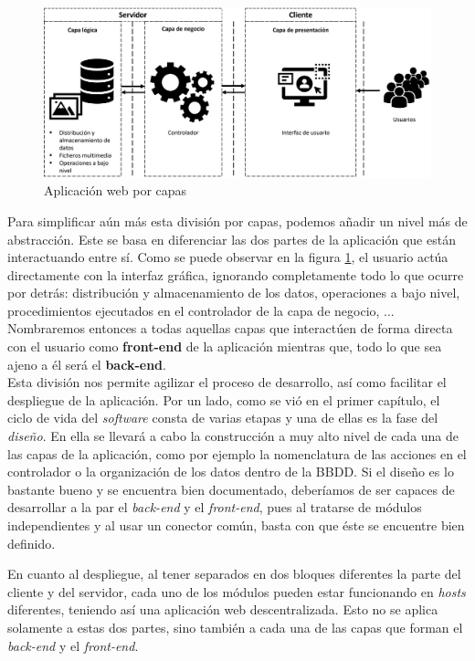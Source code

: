 \documentclass[../main.tex]{subfiles}
\begin{document}
    \begin{figure}[!h]
          \centering
          \includegraphics[width=\textwidth]{images/estructura_aplicacion_web.png}
          \caption{Aplicación web por capas}
          \label{fig:web_capas}
      \end{figure}
      
    Para simplificar aún más esta división por capas, podemos añadir un nivel más de abstracción. Este se basa en diferenciar las dos partes de la aplicación que están interactuando entre sí. Como se puede observar en la figura \ref{fig:web_capas}, el usuario actúa directamente con la interfaz gráfica, ignorando completamente todo lo que ocurre por detrás: distribución y almacenamiento de los datos, operaciones a bajo nivel, procedimientos ejecutados en el controlador de la capa de negocio, ... Nombraremos entonces a todas aquellas capas que interactúen de forma directa con el usuario como \textbf{front-end} de la aplicación mientras que, todo lo que sea ajeno a él será el \textbf{back-end}. \\
    
    Esta división nos permite agilizar el proceso de desarrollo, así como facilitar el despliegue de la aplicación. Por un lado, como se vió en el primer capítulo, el ciclo de vida del \textit{software} consta de varias etapas y una de ellas es la fase del \textit{diseño}. En ella se llevará a cabo la construcción a muy alto nivel de cada una de las capas de la aplicación, como por ejemplo la nomenclatura de las acciones en el controlador o la organización de los datos dentro de la BBDD. Si el diseño es lo bastante bueno y se encuentra bien documentado, deberíamos de ser capaces de desarrollar a la par el \textit{back-end} y el \textit{front-end}, pues al tratarse de módulos independientes y al usar un conector común, basta con que éste se encuentre bien definido. 
    
    En cuanto al despliegue, al tener separados en dos bloques diferentes la parte del cliente y del servidor, cada uno de los módulos pueden estar funcionando en \textit{hosts} diferentes, teniendo así una aplicación web descentralizada. Esto no se aplica solamente a estas dos partes, sino también a cada una de las capas que forman el \textit{back-end} y el \textit{front-end}. \\
    
\end{document}
